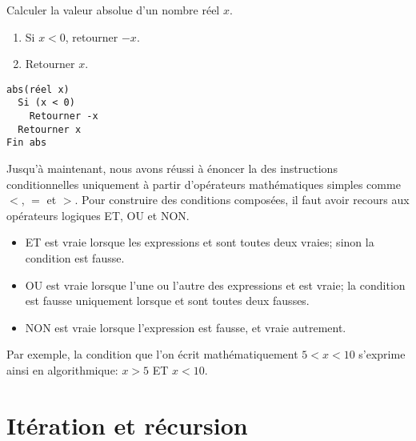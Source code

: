 \begin{algorithmebis}
  \label{algo:algorithmes:abs:simplifie:bis}
  Calculer la valeur absolue d'un nombre réel $x$.

  \noindent
  \begin{minipage}[t]{0.48\linewidth}
    \begin{enumerate}
    \item Si $x < 0$, retourner $-x$.
    \item Retourner $x$.
    \end{enumerate}
  \end{minipage}
  \hfill
  \begin{minipage}[t]{0.48\linewidth}
    \begin{Schunk}
\begin{Verbatim}
abs(réel x)
  Si (x < 0)
    Retourner -x
  Retourner x
Fin abs
\end{Verbatim}
    \end{Schunk}
  \end{minipage}
\end{algorithmebis}

Jusqu'à maintenant, nous avons réussi à énoncer la 
des instructions conditionnelles uniquement à partir d'opérateurs
mathématiques simples comme $<$, $=$ et $>$. Pour construire des
conditions composées, il faut avoir recours aux opérateurs logiques
ET, OU et NON.
\begin{itemize}
\item {} ET  est vraie lorsque les expressions
   et  sont toutes deux vraies; sinon la
  condition est fausse.
\item {} OU  est vraie lorsque l'une ou l'autre
  des expressions  et  est vraie; la condition
  est fausse uniquement lorsque  et  sont
  toutes deux fausses.
\item NON  est vraie lorsque l'expression  est fausse,
  et vraie autrement.
\end{itemize}

Par exemple, la condition que l'on écrit mathématiquement $5 < x < 10$
s'exprime ainsi en algorithmique: $x > 5$ ET $x < 10$.


\section{Itération et récursion}
\label{sec:algorithmes:iteration}

